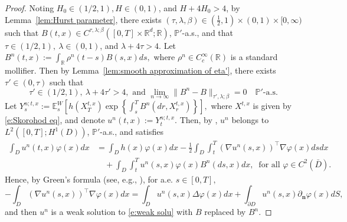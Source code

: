 \documentclass[11pt,reqno]{amsart}
\def\R{\mathbb R}
\numberwithin{equation}{section}
\begin{document}
\begin{proof}
Noting $H_0\in(1/2,1),H\in(0,1)$, and $H + 4 H_{0} > 4$, by Lemma~\ref{lem:Hurst parameter}, there exists $(\tau,\lambda,\beta)\in(\frac{1}{2},1)\times (0,1)\times [0,\infty)$ such that $B(t,x)\in C^{\tau,\lambda;\beta}([0,T]\times \R^d;\R)$, $\mathbb{P}'$-a.s., and that $
\tau\in(1/2,1),\ \lambda\in(0,1)$, and $ \lambda + 4\tau > 4$.  Let $B^{n}(t,x) := \int_{\R}\rho^{n}(t-s)B(s,x)ds,$ where $\rho^n\in C^{\infty}_{c}(\R)$ is a standard mollifier. Then by Lemma~\ref{lem:smooth approximation of eta'}, there exists $\tau'\in (0,\tau)$ such that
\begin{equation}\label{e:Bn -> B}
\tau'\in(1/2,1),\ \lambda + 4\tau' > 4,\text{ and }\lim_{n\rightarrow \infty}\|B^{n} - B\|_{\tau',\lambda;\beta} = 0\quad \mathbb{P}'\text{-a.s.}
\end{equation}
Let $Y^{n;t,x}_{s} := \mathbb{E}^{W}_{s}\left[h(X^{t,x}_{T})\exp\left\{\int_{s}^{T}B^{n}(dr,X^{t,x}_{r})\right\}\right],$ where $X^{t,x}$ is given by \eqref{e:Skorohod eq}, and denote $u^{n}(t,x) := Y^{n;t,x}_{t}$. Then, by \cite[Theorem~3]{Wong-Yang-Zhang-22}, $u^{n}$ belongs to  $L^{2}([0,T];H^{1}(D))$, $\mathbb{P}'$-a.s., and satisfies  
\begin{equation*}
\begin{aligned}
\int_{D}u^{n}(t,x)\varphi(x)dx &= \int_{D}h(x)\varphi(x)dx - \frac{1}{2}\int_{D}\int_{t}^{T}\left(\nabla u^{n}(s,x)\right)^{\top} \nabla \varphi(x) ds dx \\
&\quad + \int_{D}\int_{t}^{T}u^{n}(s,x)\varphi(x)B^{n}(ds,x)dx, ~ \text{ for all } \varphi\in C^{2}(\bar{D}).
\end{aligned}
\end{equation*}
Hence, by Green's formula (see, e.g., \cite[(4.31) in Chapter~4]{taylor1996partial}), for a.e. $s\in[0,T],$
\[- \int_{D} \left( \nabla u^n(s,x)\right)^{\top} \nabla \varphi(x) dx = \int_{D} u^n(s,x) \Delta \varphi(x) dx + \int_{\partial D} u^{n}(s,x) \partial_{\mathbf{n}}\varphi(x) dS,\] 
and then $u^{n}$ is a weak solution to \eqref{e:weak solu} with $B$ replaced by $B^{n}$.


\end{proof}
\end{document}
